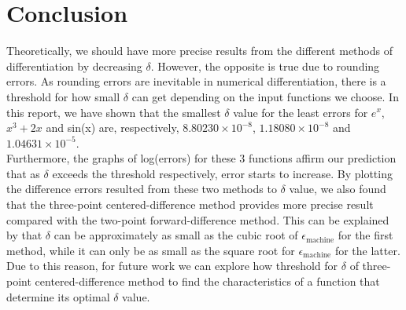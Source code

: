\documentclass{article}
\begin{document}
\vspace{-10mm}

\section*{Conclusion}
Theoretically, we should have more precise results from the different methods of differentiation by decreasing $\delta$. However, the opposite is true due to rounding errors. As rounding errors are inevitable in numerical differentiation, there is a threshold for how small $\delta$ can get depending on the input functions we choose. In this report, we have shown that the smallest $\delta$ value for the least errors for $e^x$, $x^3 + 2x$ and sin(x) are, respectively, $8.80230 \times 10^{-8}$, $1.18080 \times 10^{-8}$ and $1.04631 \times 10^{-5}$.  \\

\noindent Furthermore, the graphs of log(errors) for these 3 functions affirm our prediction that as $\delta$ exceeds the threshold respectively, error starts to increase. By plotting the difference errors resulted from these two methods to $\delta$ value, we also found that the three-point centered-difference method provides more precise result compared with the two-point forward-difference method. This can be explained by that $\delta$ can be approximately as small as the cubic root of $\epsilon_{\text{machine}}$ for the first method, while it can only be as small as the square root for $\epsilon_{\text{machine}}$ for the latter. Due to this reason, for future work we can explore how threshold for $\delta$ of three-point centered-difference method to find the characteristics of a function that determine its optimal $\delta$ value.
\end{document}
